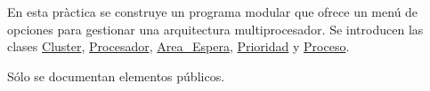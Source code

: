 En esta pràctica se construye un programa modular que ofrece un menú de opciones para gestionar una arquitectura multiprocesador. Se introducen las clases \mbox{\hyperlink{classCluster}{Cluster}}, \mbox{\hyperlink{classProcesador}{Procesador}}, \mbox{\hyperlink{classArea__Espera}{Area\+\_\+\+Espera}}, \mbox{\hyperlink{classPrioridad}{Prioridad}} y \mbox{\hyperlink{classProceso}{Proceso}}.

Sólo se documentan elementos públicos. 